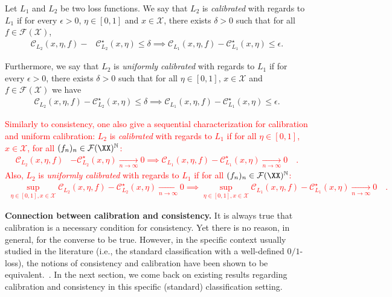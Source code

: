 \begin{definition}[Calibration]
Let $L_1$ and $L_2$ be two loss functions. We say that $L_2$ is \emph{calibrated} with regards to $L_1$ if for every $\epsilon>0$, $\eta\in[0,1]$ and $x\in\mathcal{X}$, there exists $ \delta>0$ such that for all $f\in\mathcal{F}(\mathcal{X})$,
\begin{align*}
    \mathcal{C}_{L_2}(x,\eta,f)- &\mathcal{C}^\star_{L_2}(x,\eta)\leq\delta\implies\mathcal{C}_{L_1}(x,\eta,f)- \mathcal{C}^\star_{L_1}(x,\eta)\leq \epsilon.
\end{align*}

Furthermore, we say that $L_2$ is \emph{uniformly calibrated} with regards to $L_1$ if for every $\epsilon>0$, there exists $ \delta>0$ such that for all $\eta\in[0,1]$, $x\in\mathcal{X}$ and $f\in\mathcal{F}(\mathcal{X})$ we have
\begin{align*}
    \mathcal{C}_{L_2}(x,\eta,f)- \mathcal{C}^\star_{L_2}(x,\eta)\leq\delta\implies\mathcal{C}_{L_1}(x,\eta,f)- \mathcal{C}^\star_{L_1}(x,\eta)\leq \epsilon.
\end{align*}
\end{definition}

\textcolor{red}{
Similarly to consistency, one also give a sequential characterization for calibration and uniform calibration: $L_2$ is \emph{calibrated} with regards to $L_1$ if for all $\eta\in[0,1]$, $x\in\mathcal{X}$, for all $(f_n)_n\in\mathcal{F}(\XX)^\mathbb{N}$:
\begin{align*}
   \mathcal{C}_{L_2}(x,\eta,f)&- \mathcal{C}^\star_{L_2}(x,\eta)\xrightarrow[n\to\infty]{} 0
   \implies \mathcal{C}_{L_1}(x,\eta,f)- \mathcal{C}^\star_{L_1}(x,\eta)\xrightarrow[n\to\infty]{} 0\quad.
\end{align*}
} 
\textcolor{red}{
Also, $L_2$ is \emph{uniformly calibrated} with regards to $L_1$ if for all $(f_n)_n\in\mathcal{F}(\XX)^\mathbb{N}$:
\begin{align*}
    \sup_{\eta\in[0,1],x\in\mathcal{X}} \mathcal{C}_{L_2}(x,\eta,f)- \mathcal{C}^\star_{L_2}(x,\eta)\xrightarrow[n\to\infty]{} 0\implies\sup_{\eta\in[0,1],x\in\mathcal{X}} \mathcal{C}_{L_1}(x,\eta,f)- \mathcal{C}^\star_{L_1}(x,\eta)\xrightarrow[n\to\infty]{} 0\quad.
\end{align*} }


\textbf{Connection between calibration and consistency.}
It is always true that calibration is a necessary condition for consistency. Yet there is no reason, in general, for the converse to be true. However, in the specific context usually studied in the literature (i.e., the standard classification with a well-defined $0/1$-loss), the notions of consistency and calibration have been shown to be equivalent.~\citep{zhang2004statistical,bartlett2006convexity,steinwart2007compare}. In the next section, we come back on existing results regarding calibration and consistency in this specific (standard) classification setting. 


